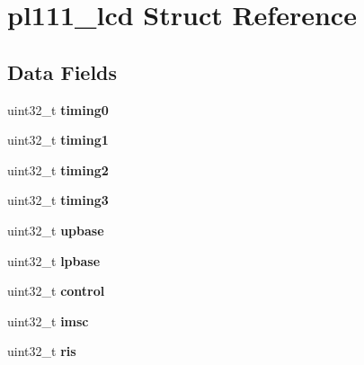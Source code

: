 \hypertarget{structpl111__lcd}{}\section{pl111\+\_\+lcd Struct Reference}
\label{structpl111__lcd}
\subsection*{Data Fields}
\begin{DoxyCompactItemize}
\item 
\mbox{\label{structpl111__lcd_a6186d497b391d5bab45b89b032b34b58}} 
uint32\+\_\+t {\bfseries timing0}
\item 
\mbox{\label{structpl111__lcd_a11d8abe47e84521f8bea85e4fe33af2d}} 
uint32\+\_\+t {\bfseries timing1}
\item 
\mbox{\label{structpl111__lcd_a363244c5b91c3b5e50d79715d6d391b4}} 
uint32\+\_\+t {\bfseries timing2}
\item 
\mbox{\label{structpl111__lcd_a4f004c1378777c2300a13d3f8709d26f}} 
uint32\+\_\+t {\bfseries timing3}
\item 
\mbox{\label{structpl111__lcd_a86096f76266b2d742b8757defc551a18}} 
uint32\+\_\+t {\bfseries upbase}
\item 
\mbox{\label{structpl111__lcd_a101aa9273da775d265404099901c0219}} 
uint32\+\_\+t {\bfseries lpbase}
\item 
\mbox{\label{structpl111__lcd_a26bf538174ddcd6898556f96c8a3625a}} 
uint32\+\_\+t {\bfseries control}
\item 
\mbox{\label{structpl111__lcd_a8ea1d7339b8b91f492e9436881b8e704}} 
uint32\+\_\+t {\bfseries imsc}
\item 
\mbox{\label{structpl111__lcd_a3a70f24e9948469b696b11fe554b1cc9}} 
uint32\+\_\+t {\bfseries ris}
\item 
\mbox{\label{structpl111__lcd_a323bfd0f5a5bf586cd14fd6add5ac1a1}} 

\end{DoxyCompactItemize}
